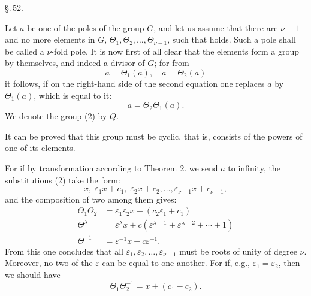
\begin{center}
\S.\,52.

\end{center}

Let $a$ be one of the poles of the group $G$, and let us
assume that there are $\nu - 1$ and no more elements in $G$,
$\Theta_1, \Theta_2, \ldots, \Theta_{\nu-1}$, such that
holds. Such a pole shall be called a $\nu$-fold pole. It is
now first of all clear that the elements
form a group by themselves, and indeed a divisor of $G$;
for from
\[
a = \Theta_1(a), \quad a = \Theta_2(a)
\]
it follows, if on the right-hand side of the second equation
one replaces $a$ by $\Theta_1(a)$, which is equal to it:
\[
a = \Theta_2 \Theta_1(a).
\]
We denote the group (2) by $Q$.

It can be proved that this group must be cyclic, that is,
consists of the powers of one of its elements.

For if by transformation according to Theorem 2.
we send $a$ to infinity, the substitutions (2) take the
form:
\[
x, \; \varepsilon_1 x + c_1, \; \varepsilon_2 x + c_2, \ldots, \varepsilon_{\nu-1} x + c_{\nu-1},
\]
and the composition of two among them gives:
\[
\begin{aligned}
\Theta_1 \Theta_2 &= \varepsilon_1 \varepsilon_2 x + (c_2 \varepsilon_1 + c_1) \\
\Theta^\lambda &= \varepsilon^\lambda x + c(\varepsilon^{\lambda-1} + \varepsilon^{\lambda-2} + \cdots + 1) \\
\Theta^{-1} &= \varepsilon^{-1} x - c \varepsilon^{-1}.
\end{aligned}
\]
From this one concludes that all $\varepsilon_1, \varepsilon_2, \ldots, \varepsilon_{\nu-1}$ must be roots
of unity of degree $\nu$. Moreover, no two of the $\varepsilon$ can be
equal to one another. For if, e.g., $\varepsilon_1 = \varepsilon_2$, then we should have
\[
\Theta_1 \Theta_2^{-1} = x + (c_1 - c_2).
\]
